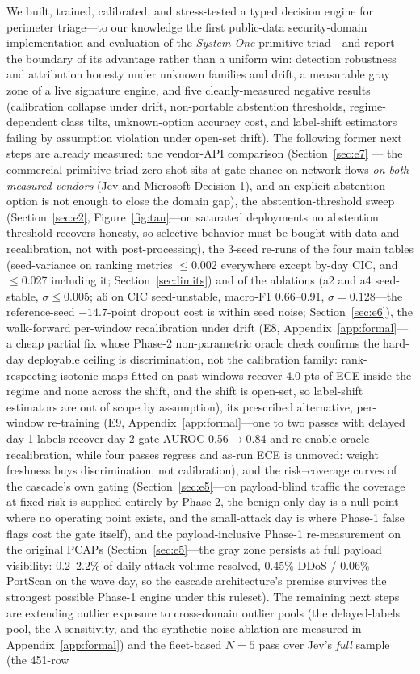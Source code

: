 \documentclass[sigconf,anonymous=false]{acmart}
\begin{document}
We built, trained, calibrated, and stress-tested a typed decision engine for perimeter triage---to our knowledge the first public-data security-domain implementation and evaluation of the \emph{System One} primitive triad---and report the boundary of its advantage rather than a uniform win: detection robustness and attribution honesty under unknown families and drift, a measurable gray zone of a live signature engine, and five cleanly-measured negative results (calibration collapse under drift, non-portable abstention thresholds, regime-dependent class tilts, unknown-option accuracy cost, and label-shift estimators failing by assumption violation under open-set drift). The following former next steps are already measured: the vendor-API comparison (Section~\ref{sec:e7} --- the commercial primitive triad zero-shot sits at gate-chance on network flows \emph{on both measured vendors} (Jev and Microsoft Decision-1), and an explicit abstention option is not enough to close the domain gap), the abstention-threshold sweep (Section~\ref{sec:e2}, Figure~\ref{fig:tau}---on saturated deployments no abstention threshold recovers honesty, so selective behavior must be bought with data and recalibration, not with post-processing), the 3-seed re-runs of the four main tables (seed-variance on ranking metrics $\le$0.002 everywhere except by-day CIC, and $\le$0.027 including it; Section~\ref{sec:limits}) and of the ablations (a2 and a4 seed-stable, $\sigma\le$0.005; a6 on CIC seed-unstable, macro-F1 0.66--0.91, $\sigma{=}0.128$---the reference-seed $-14.7$-point dropout cost is within seed noise; Section~\ref{sec:e6}), the walk-forward per-window recalibration under drift (E8, Appendix~\ref{app:formal}---a cheap partial fix whose Phase-2 non-parametric oracle check confirms the hard-day deployable ceiling is discrimination, not the calibration family: rank-respecting isotonic maps fitted on past windows recover 4.0 pts of ECE inside the regime and none across the shift, and the shift is open-set, so label-shift estimators are out of scope by assumption), its prescribed alternative, per-window re-training (E9, Appendix~\ref{app:formal}---one to two passes with delayed day-1 labels recover day-2 gate AUROC 0.56$\to$0.84 and re-enable oracle recalibration, while four passes regress and as-run ECE is unmoved: weight freshness buys discrimination, not calibration), and the risk--coverage curves of the cascade's own gating (Section~\ref{sec:e5}---on payload-blind traffic the coverage at fixed risk is supplied entirely by Phase 2, the benign-only day is a null point where no operating point exists, and the small-attack day is where Phase-1 false flags cost the gate itself), and the payload-inclusive Phase-1 re-measurement on the original PCAPs (Section~\ref{sec:e5}---the gray zone persists at full payload visibility: 0.2--2.2\% of daily attack volume resolved, 0.45\% DDoS / 0.06\% PortScan on the wave day, so the cascade architecture's premise survives the strongest possible Phase-1 engine under this ruleset). The remaining next steps are extending outlier exposure to cross-domain outlier pools (the delayed-labels pool, the $\lambda$ sensitivity, and the synthetic-noise ablation are measured in Appendix~\ref{app:formal}) and the fleet-based $N{=}5$ pass over Jev's \emph{full} sample (the 451-row 
\end{document}
